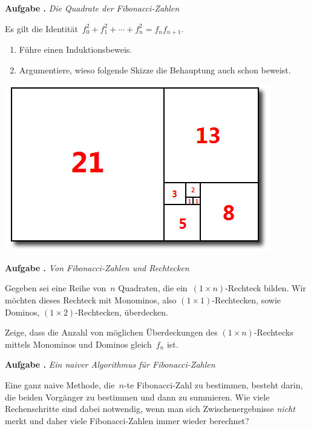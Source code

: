 \documentclass[a4paper,ngerman,twoside]{scrartcl}
\newlength{\aufgabenskip}
\newcounter{aufgabennummer}
\newenvironment{aufgabe}[1]{
  \addtocounter{aufgabennummer}{1}
  \textbf{Aufgabe \theaufgabennummer.} \emph{#1} \par
}{\vspace{\aufgabenskip}}
\begin{document}
\begin{aufgabe}{Die Quadrate der Fibonacci-Zahlen}
Es gilt die Identität~$f_0^2 + f_1^2 + \cdots + f_n^2 = f_n f_{n+1}$.
\begin{enumerate}
\item Führe einen Induktionsbeweis.
\item Argumentiere, wieso folgende Skizze die Behauptung auch schon beweist.
\end{enumerate}
\begin{center}
  \includegraphics[scale=0.3]{fibonacci-quadrate}
\end{center}
\end{aufgabe}

\begin{aufgabe}{Von Fibonacci-Zahlen und Rechtecken}
Gegeben sei eine Reihe von~$n$ Quadraten, die ein~$(1 \times n)$-Rechteck
bilden. Wir möchten dieses Rechteck mit Monominos, also
$(1 \times 1)$-Rechtecken, sowie Dominos, $(1\times 2)$-Rechtecken, überdecken.

Zeige, dass die Anzahl von möglichen Überdeckungen des $(1 \times n)$-Rechtecks
mittels Monominos und Dominos gleich~$f_n$ ist.
\end{aufgabe}

\begin{aufgabe}{Ein naiver Algorithmus für Fibonacci-Zahlen}
Eine ganz naive Methode, die~$n$-te Fibonacci-Zahl zu bestimmen, besteht
darin, die beiden Vorgänger zu bestimmen und dann zu summieren. Wie viele
Rechenschritte sind dabei notwendig, wenn man sich
Zwischenergebnisse \emph{nicht} merkt und daher viele Fibonacci-Zahlen immer wieder
berechnet?
\end{aufgabe}
\end{document}
